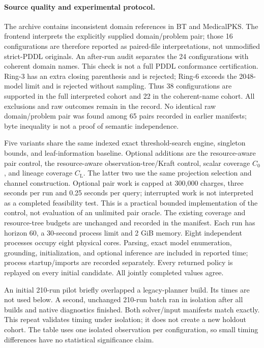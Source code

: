 \documentclass[11pt]{article}
\theoremstyle{definition}
\newcommand{\CL}{C_{\mathrm L}}
\begin{document}
\paragraph{Source quality and experimental protocol.}
The archive contains inconsistent domain references in BT and MedicalPKS.
The frontend interprets the explicitly supplied domain/problem pair; those
16 configurations are therefore reported as paired-file interpretations, not
unmodified strict-PDDL originals. An after-run audit separates the 24
configurations with coherent domain names. This check is not a full PDDL
conformance certification. Ring-3 has an extra closing parenthesis and is
rejected; Ring-6 exceeds the 2048-model limit and is rejected without sampling.
Thus 38 configurations are supported in the full interpreted cohort and 22 in
the coherent-name cohort. All exclusions and raw outcomes remain in the record.
No identical raw domain/problem pair was found among 65 pairs recorded in
earlier manifests; byte inequality is not a proof of semantic independence.

Five variants share the same indexed exact threshold-search engine, singleton
bounds, and leaf-information baseline. Optional additions are the resource-aware
pair control, the resource-aware observation-tree/Kraft control, scalar coverage
$C_0$, and lineage coverage $\CL$. The latter two use the same projection
selection and channel construction. Optional pair work is capped at 300,000
charges, three seconds per run and 0.25 seconds per query; interrupted work is
not interpreted as a completed feasibility test. This is a practical bounded
implementation of the control, not evaluation of an unlimited pair oracle.
The existing coverage and resource-tree budgets are unchanged and recorded in
the manifest. Each run has horizon 60, a 30-second process limit and 2 GiB memory.
Eight independent processes occupy eight physical cores. Parsing, exact model
enumeration, grounding, initialization, and optional inference are included in
reported time; process startup/imports are recorded separately. Every returned
policy is replayed on every initial candidate. All jointly completed values agree.

An initial 210-run pilot briefly overlapped a legacy-planner build. Its times
are not used below. A second, unchanged 210-run batch ran in isolation after
all builds and native diagnostics finished. Both solver/input manifests match
exactly. This repeat validates timing under isolation; it does not create a new
holdout cohort. The table uses one isolated observation per configuration, so
small timing differences have no statistical significance claim.
\end{document}

